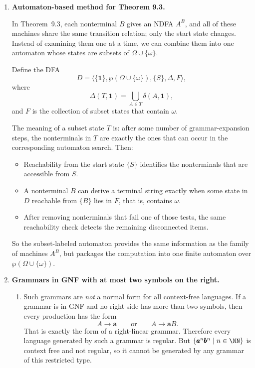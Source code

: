 \begin{enumerate}[{9.}1. ]
\begin{enumerate}
If $\mathfrak{C}_{\Sigma}$ were closed under complement, then by De Morgan's law
it would also be closed under intersection, since it is already closed under
union.  This contradiction shows that $\mathfrak{C}_{\Sigma}$ is not closed
under complement either. \qed
\end{enumerate}

\item \textbf{Automaton-based method for Theorem 9.3.}

In Theorem~9.3, each nonterminal $B$ gives an NDFA $A^B$, and all of these
machines share the same transition relation; only the start state changes.
Instead of examining them one at a time, we can combine them into one automaton
whose states are subsets of $\Omega\cup\{\omega\}$.

Define the DFA
\[
D=\langle \{\pmb{1}\},\wp(\Omega\cup\{\omega\}),\{S\},\Delta,F\rangle,
\]
where
\[
\Delta(T,\pmb{1})=\bigcup_{A\in T}\delta(A,\pmb{1}),
\]
and $F$ is the collection of subset states that contain $\omega$.

The meaning of a subset state $T$ is: after some number of grammar-expansion
steps, the nonterminals in $T$ are exactly the ones that can occur in the
corresponding automaton search.  Then:
\begin{itemize}
\item Reachability from the start state $\{S\}$ identifies the nonterminals
that are accessible from $S$.
\item A nonterminal $B$ can derive a terminal string exactly when some state in
$D$ reachable from $\{B\}$ lies in $F$, that is, contains $\omega$.
\item After removing nonterminals that fail one of those tests, the same
reachability check detects the remaining disconnected items.
\end{itemize}
So the subset-labeled automaton provides the same information as the family of
machines $A^B$, but packages the computation into one finite automaton over
$\wp(\Omega\cup\{\omega\})$.

\item \textbf{Grammars in GNF with at most two symbols on the right.}

\begin{enumerate}
\item Such grammars are \emph{not} a normal form for all context-free
languages.  If a grammar is in GNF and no right side has more than two symbols,
then every production has the form
\[
A\to \pmb{a}\qquad\text{or}\qquad A\to \pmb{a}B.
\]
That is exactly the form of a right-linear grammar.  Therefore every language
generated by such a grammar is regular.  But
$\{\pmb{a}^n\pmb{b}^n\mid n\in\NN\}$ is context free and not regular, so it
cannot be generated by any grammar of this restricted type.


\end{enumerate}
\end{enumerate}
